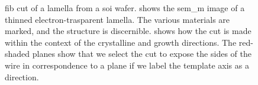 \begin{figure}
{
    }
    \caption{\acs{fib} cut of a lamella from a  \acs{soi} wafer.  shows the \acs{sem_m} image of a thinned electron-trasparent lamella. The various materials are marked, and the structure is discernible.  shows how the cut is made within the context of the crystalline and growth directions. The red-shaded planes show that we select the cut to expose the sides of the wire in correspondence to a  plane if we label the template axis as a  direction.}
    \label{fig:001_FIB}
\end{figure}


